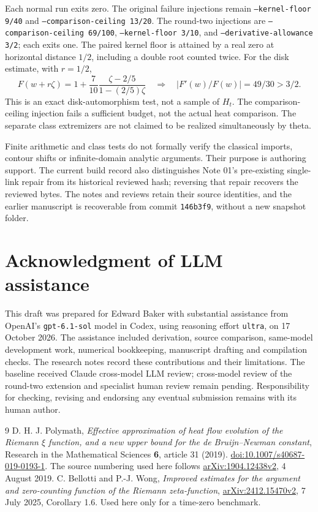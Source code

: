 \documentclass[11pt]{article}
\theoremstyle{remark}
\numberwithin{equation}{section}
\begin{document}
Each normal run exits zero. The original failure injections remain
\texttt{--kernel-floor 9/40} and \texttt{--comparison-ceiling 13/20}.
The round-two injections are \texttt{--comparison-ceiling 69/100},
\texttt{--kernel-floor 3/10}, and \texttt{--derivative-allowance 3/2};
each exits one. The paired kernel floor is attained by a real zero at
horizontal distance $1/2$, including a double root counted twice.
For the disk estimate, with $r=1/2$,
\[
 F(w+r\zeta)=1+\frac7{10}\frac{\zeta-2/5}{1-(2/5)\zeta}
 \quad\Longrightarrow\quad |F'(w)/F(w)|=49/30>3/2.
\]
This is an exact disk-automorphism test, not a sample of $H_t$.
The comparison-ceiling injection fails a sufficient budget, not the
actual heat comparison. The separate class extremizers are not claimed
to be realized simultaneously by theta.

Finite arithmetic and class tests do not formally verify the classical
imports, contour shifts or infinite-domain analytic arguments. Their
purpose is authoring support. The current build record also distinguishes
Note 01's pre-existing single-link repair from its historical reviewed
hash; reversing that repair recovers the reviewed bytes. The notes and
reviews retain their source identities, and the earlier manuscript is
recoverable from commit \texttt{146b3f9}, without a new snapshot folder.

\section*{Acknowledgment of LLM assistance}
This draft was prepared for Edward Baker with substantial assistance
from OpenAI's \texttt{gpt-6.1-sol} model in Codex, using reasoning effort
\texttt{ultra}, on 17 October 2026. The assistance included derivation,
source comparison, same-model development work, numerical bookkeeping,
manuscript drafting and compilation checks. The research notes record
these contributions and their limitations. The baseline received Claude cross-model LLM review; cross-model review
of the round-two extension and specialist human review remain pending. Responsibility for checking,
revising and endorsing any eventual submission remains with its human
author.

\begin{thebibliography}{9}
D. H. J. Polymath,
\emph{Effective approximation of heat flow evolution of the Riemann
$\xi$ function, and a new upper bound for the de Bruijn--Newman constant},
Research in the Mathematical Sciences \textbf{6}, article 31 (2019).
\href{https://doi.org/10.1007/s40687-019-0193-1}{doi:10.1007/s40687-019-0193-1}.
The source numbering used here follows
\href{https://arxiv.org/abs/1904.12438v2}{arXiv:1904.12438v2},
4 August 2019.
C. Bellotti and P.-J. Wong,
\emph{Improved estimates for the argument and zero-counting function of
the Riemann zeta-function},
\href{https://arxiv.org/abs/2412.15470v2}{arXiv:2412.15470v2}, 7 July 2025,
Corollary 1.6. Used here only for a time-zero benchmark.
\end{thebibliography}
\end{document}
